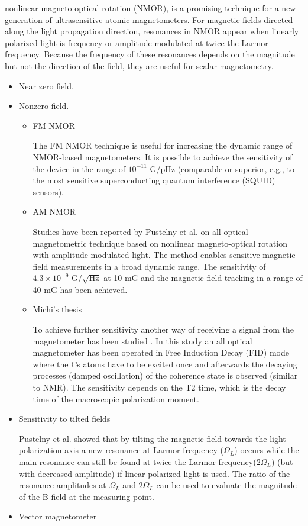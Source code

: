 \begin{itemize}
nonlinear magneto-optical rotation (NMOR), is a promising technique for a new generation of ultrasensitive atomic magnetometers. For magnetic fields directed along the light propagation direction, resonances in NMOR appear when linearly polarized light is frequency or amplitude modulated at twice the Larmor frequency. Because the frequency of these resonances depends on the magnitude but not the direction of the field, they are useful for scalar magnetometry.
  \begin{itemize}
    \item Near zero field.
    \item Nonzero field.
      \begin{itemize}
      \item FM NMOR 
      
      The FM NMOR technique is useful for increasing the dynamic range of NMOR-based magnetometers.  It is possible to achieve the  sensitivity of the device in the range of  $10^{−11} $ G/pHz (comparable or superior, e.g., to the most sensitive superconducting quantum interference (SQUID) sensors)\cite{bib:FMNMOR}.
      \item AM NMOR
       
 Studies have been reported by  Pustelny et al. \cite{bib:AMNMOR,bib:amNMOR} on all-optical magnetometric technique based on nonlinear magneto-optical rotation with amplitude-modulated light. The method enables sensitive magnetic-field measurements in a broad dynamic range. The sensitivity of  $4.3\times10^{-9}$ G/$\sqrt{\text{Hz}}$ at 10 mG and the magnetic field tracking in a range of 40 mG has been achieved.
      
      \item Michi's thesis

  To achieve further sensitivity another way of receiving a signal from the magnetometer
has been studied \cite{mythesis}. In this study an all optical magnetometer has been operated in Free Induction Decay (FID) mode where the Cs atoms have to be excited
once and afterwards the decaying processes (damped oscillation) of the coherence state is
observed (similar to NMR). The sensitivity depends on the T2 time, which is the decay time
of the macroscopic polarization moment.
      \end{itemize}
    \item Sensitivity to tilted fields
    
    Pustelny et al. \cite{PhysRevA.74.063420}  showed that by
tilting the magnetic field towards the light polarization axis a new resonance at Larmor frequency ($\Omega_L$) occurs
while the main resonance can still be found at twice the Larmor frequency($2\Omega_L$) (but with decreased amplitude) if linear
polarized light is used. The ratio of the resonance amplitudes at $\Omega_L$ and $2\Omega_L$ can be used to
evaluate the magnitude of the B-field at the measuring point.
    \item Vector magnetometer
    

\end{itemize}
\end{itemize}
